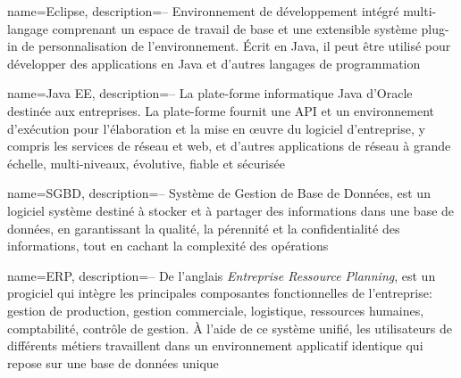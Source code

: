 
{
  name=Eclipse,
  description={-- Environnement de développement intégré multi-langage comprenant un espace de travail de base et une extensible système plug-in de personnalisation de l'environnement. Écrit en Java, il peut être utilisé pour développer des applications en Java et d'autres langages de programmation}
}

{
  name=Java EE,
  description={-- La plate-forme informatique Java d'Oracle destinée aux entreprises. La plate-forme fournit une API et un environnement d'exécution pour l'élaboration et la mise en œuvre du logiciel d'entreprise, y compris les services de réseau et web, et d'autres applications de réseau à grande échelle, multi-niveaux, évolutive, fiable et sécurisée}
}

{
  name=SGBD,
  description={-- Système de Gestion de Base de Données, est un logiciel système destiné à stocker et à partager des informations dans une base de données, en garantissant la qualité, la pérennité et la confidentialité des informations, tout en cachant la complexité des opérations}
}

{
  name=ERP,
  description={-- De l'anglais \textit{Entreprise Ressource Planning}, est un progiciel qui intègre les principales composantes fonctionnelles de l'entreprise: gestion de production, gestion commerciale, logistique, ressources humaines, comptabilité, contrôle de gestion. À l'aide de ce système unifié, les utilisateurs de différents métiers travaillent dans un environnement applicatif identique qui repose sur une base de données unique}
}

